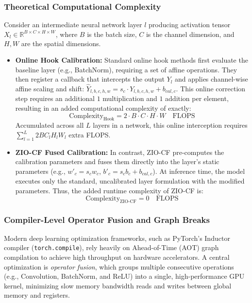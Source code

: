 \documentclass{article}
\begin{document}
\subsubsection{Theoretical Computational Complexity}
Consider an intermediate neural network layer $l$ producing activation tensor $X_l \in \mathbb{R}^{B \times C \times H \times W}$, where $B$ is the batch size, $C$ is the channel dimension, and $H, W$ are the spatial dimensions.
\begin{itemize}
    \item \textbf{Online Hook Calibration:} Standard online hook methods first evaluate the baseline layer (e.g., BatchNorm), requiring a set of affine operations. They then register a callback that intercepts the output $Y_l$ and applies channel-wise affine scaling and shift: $\hat{Y}_{l, b, c, h, w} = s_c \cdot Y_{l, b, c, h, w} + b_{cal, c}$. This online correction step requires an additional $1$ multiplication and $1$ addition per element, resulting in an added computational complexity of exactly:
    \begin{equation}
        \text{Complexity}_{\text{Hook}} = 2 \cdot B \cdot C \cdot H \cdot W \quad \text{FLOPS}
    \end{equation}
    Accumulated across all $L$ layers in a network, this online interception requires $\sum_{l=1}^L 2 B C_l H_l W_l$ extra FLOPS.
    \item \textbf{ZIO-CF Fused Calibration:} In contrast, ZIO-CF pre-computes the calibration parameters and fuses them directly into the layer's static parameters (e.g., $w'_c = s_c w_c$, $b'_c = s_c b_c + b_{cal, c}$). At inference time, the model executes only the standard, uncalibrated layer formulation with the modified parameters. Thus, the added runtime complexity of ZIO-CF is:
    \begin{equation}
        \text{Complexity}_{\text{ZIO-CF}} = 0 \quad \text{FLOPS}
    \end{equation}
\end{itemize}

\subsubsection{Compiler-Level Operator Fusion and Graph Breaks}
Modern deep learning optimization frameworks, such as PyTorch's Inductor compiler (\texttt{torch.compile}), rely heavily on Ahead-of-Time (AOT) graph compilation to achieve high throughput on hardware accelerators. A central optimization is \textit{operator fusion}, which groups multiple consecutive operations (e.g., Convolution, BatchNorm, and ReLU) into a single, high-performance GPU kernel, minimizing slow memory bandwidth reads and writes between global memory and registers.
\end{document}
